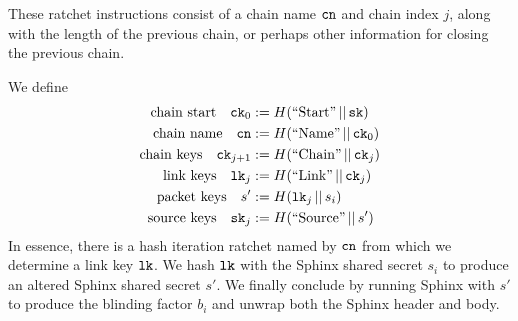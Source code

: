 \documentclass[twoside,letterpaper]{sig-alternate}
\def\mathcomma{,}
\def\mathperiod{.}
\def\mathcomma{}
\def\mathperiod{}
\begin{document}
These ratchet instructions consist of
 a chain name $\texttt{cn}$ and chain index $j$,
along with the length of the previous chain, or
 perhaps other information for closing the previous chain.  

We define
\[ \begin{aligned}
\textrm{chain start}\quad
 \ck_0 &:= H(\textrm{``Start''} \,||\, \sk) \mathcomma \\
\textrm{chain name}\quad
 \cn &:= H(\textrm{``Name''} \,||\, \ck_0) \mathcomma \\
\textrm{chain keys}\quad
 \ck_{j+1} &:= H(\textrm{``Chain''} \,||\, \ck_j) \mathcomma \\
\textrm{link keys}\quad
 \lk_j &:= H(\textrm{``Link''} \,||\, \ck_j) \mathcomma \\
\textrm{packet keys}\quad 
 s' &:= H(\lk_j \,||\, s_i) \mathcomma \\ %
\textrm{source keys}\quad 
 \sk_j &:= H(\textrm{``Source''} \,||\, s') \mathperiod \\
\end{aligned} \]
In essence, there is a hash iteration ratchet named by $\texttt{cn}$
from which we determine a link key $\texttt{lk}$.
We hash $\texttt{lk}$ with the Sphinx shared secret $s_i$ to produce
an altered Sphinx shared secret $s'$.
We finally conclude by running Sphinx with $s'$ to produce the 
blinding factor $b_i$ and unwrap both the Sphinx header and body. 

\begin{figure}[th!]
\end{figure}
\end{document}
